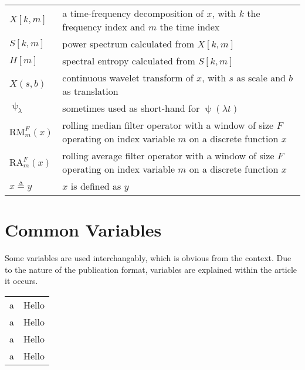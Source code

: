 \begin{tabular}{p{} p{}}
    $X[k,m]$ & a time-frequency decomposition of $x$, with $k$ the frequency index and $m$ the time index \\
    $S[k,m]$ & power spectrum calculated from $X[k, m]$ \\
    $H[m]$ & spectral entropy calculated from $S[k, m]$ \\
    $X(s, b)$ & continuous wavelet transform of $x$, with $s$ as scale and $b$ as translation \\
    $\uppsi_\lambda$ & sometimes used as short-hand for  $\uppsi(\lambda t)$\\
    $\text{RM}^F_m (x)$ & rolling median filter operator with a window of size $F$ operating on index variable $m$ on a discrete function $x$\\
    $\text{RA}^F_m (x)$ & rolling average filter operator with a window of size $F$ operating on index variable $m$ on a discrete function $x$\\
    $x \triangleq y$ & $x$ is defined as $y$\\
\end{tabular}

\clearpage
\section*{Common Variables}
Some variables are used interchangably, which is obvious from the context. Due to the nature of the publication format, variables are explained within the article it occurs.

\begin{tabular}{p{} p{}}
    a & Hello \\
    a & Hello \\
    a & Hello \\
    a & Hello \\
\end{tabular}

